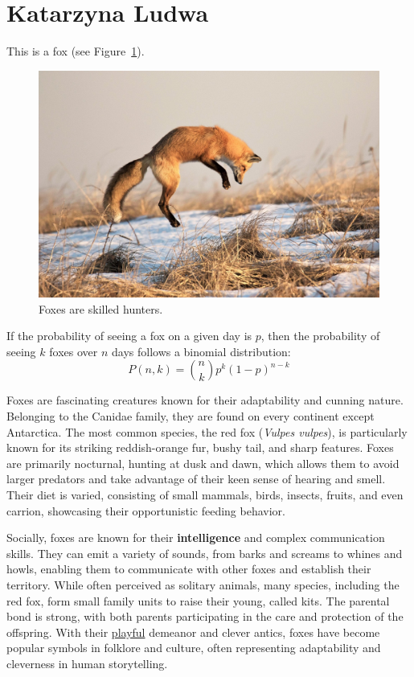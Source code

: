 \newpage
\section{Katarzyna Ludwa}
This is a fox (see Figure~\ref{fig:fox}).
\begin{figure}[htbp]
    \centering
    \includegraphics[width=1\textwidth]{pictures/hunter_lisek.jpg}
    \caption{Foxes are skilled hunters.}
    \label{fig:fox}
\end{figure}

If the probability of seeing a fox on a given day is \( p \), then the probability of seeing \( k \) foxes over \( n \) days follows a binomial distribution: 
\[P(n, k) = \binom{n}{k} p^k (1 - p)^{n -k}\]

Foxes are fascinating creatures known for their adaptability and cunning nature. Belonging to the Canidae family, they are found on every continent except Antarctica. The most common species, the red fox (\textit{Vulpes vulpes}), is particularly known for its striking reddish-orange fur, bushy tail, and sharp features. Foxes are primarily nocturnal, hunting at dusk and dawn, which allows them to avoid larger predators and take advantage of their keen sense of hearing and smell. Their diet is varied, consisting of small mammals, birds, insects, fruits, and even carrion, showcasing their opportunistic feeding behavior.
\par Socially, foxes are known for their \textbf{intelligence} and complex communication skills. They can emit a variety of sounds, from barks and screams to whines and howls, enabling them to communicate with other foxes and establish their territory. While often perceived as solitary animals, many species, including the red fox, form small family units to raise their young, called kits. The parental bond is strong, with both parents participating in the care and protection of the offspring. With their \underline{playful} demeanor and clever antics, foxes have become popular symbols in folklore and culture, often representing adaptability and cleverness in human storytelling.\paragraph{}

